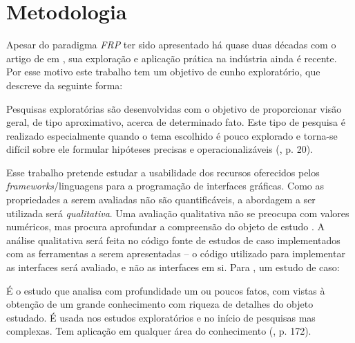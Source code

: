 \section{Metodologia}\label{lmetodologia}


Apesar do paradigma \emph{FRP} ter sido apresentado há
quase duas décadas com o artigo de 
em \citeyear{Elliott97franimation}, sua exploração e aplicação
prática na indústria ainda é recente.
Por esse motivo este trabalho tem um objetivo de
cunho exploratório, que 
descreve da seguinte forma:

\begin{citacao}
  Pesquisas exploratórias são desenvolvidas com o
  objetivo de proporcionar visão geral, de tipo aproximativo,
  acerca de determinado fato.
  Este tipo de pesquisa é realizado especialmente quando o
  tema escolhido é pouco explorado e torna-se difícil sobre
  ele formular hipóteses precisas e operacionalizáveis
  (\citeyear{gil2010metodos}, p. 20).
\end{citacao}

Esse trabalho pretende estudar a usabilidade dos recursos
oferecidos pelos \emph{frameworks}/linguagens para a
programação de interfaces gráficas.
Como as propriedades a serem avaliadas não são quantificáveis,
a abordagem a ser utilizada será \emph{qualitativa}.
Uma avaliação qualitativa não se
preocupa com valores numéricos, mas procura aprofundar
a compreensão do objeto de estudo \cite[p.~31]{gerhardt2009metodos}.
A análise qualitativa será feita no código fonte de estudos de caso
implementados com as ferramentas a serem apresentadas
-- o código utilizado para implementar as interfaces será
avaliado, e não as interfaces em si.
Para , um estudo de caso:

\begin{citacao}
  É o estudo que analisa com profundidade um ou poucos fatos,
  com vistas à obtenção de um grande conhecimento com riqueza
  de detalhes do objeto estudado. É usada nos estudos exploratórios
  e no início de pesquisas mas complexas. Tem aplicação em
  qualquer área do conhecimento (\citeyear{gil2010metodos}, p. 172).
\end{citacao}
